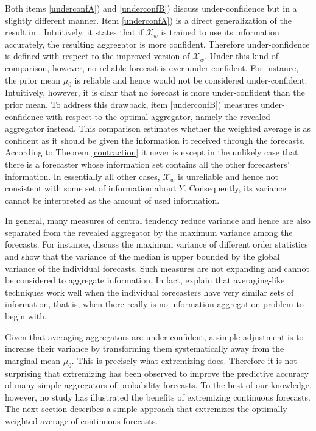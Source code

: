 \documentclass[11pt]{article}
\theoremstyle{definition}
\theoremstyle{definition}
\begin{document}
Both items \ref{underconfA}) and \ref{underconfB}) discuss under-confidence but in a slightly different manner. Item \ref{underconfA}) is a direct generalization of the result in \cite{Ranjan08}. Intuitively, it states that if $\mathcal{X}_w$ is trained to use its information accurately, the resulting aggregator is more confident. Therefore under-confidence is defined with respect to the improved version of  $\mathcal{X}_w$. Under this kind of comparison, however, no reliable forecast is ever under-confident. For instance, 
the prior mean $\mu_0$ is reliable and hence would not be considered under-confident. Intuitively, however, it is clear that no forecast is more under-confident than the prior mean. To address this drawback, item \ref{underconfB}) measures under-confidence with respect to the optimal aggregator, namely the revealed aggregator instead. This comparison estimates whether the weighted average is as confident as it should be given the information it received through the forecasts. According to Theorem \ref{contraction} it never is except in the unlikely case that there is a forecaster whose information set contains all the other forecasters' information.
 In essentially all other cases, $\mathcal{X}_w$ is unreliable 
and hence not consistent with some set of information about $Y$. Consequently, its variance cannot be interpreted as the amount of used information. 

In general, many measures of central tendency reduce variance and hence are also separated from the revealed aggregator by the maximum variance among the forecasts. For instance, \cite{papadatos1995maximum} discuss the maximum variance of different order statistics and show that the variance of the median is upper bounded by the global variance of the individual forecasts. Such measures are not expanding and cannot be considered to aggregate information. In fact, \cite{satopaamodeling} explain that averaging-like techniques work well when the individual forecasters have very similar sets of information, that is, when there really is no information aggregation problem to begin with. 

Given that averaging aggregators are under-confident, a simple adjustment is to  increase their variance by transforming them systematically away from the marginal mean $\mu_0$. This is precisely what extremizing does. Therefore it is not surprising that extremizing has been observed to improve the predictive accuracy of many simple aggregators of  probability forecasts. To the best of our knowledge, however,  no study has illustrated the benefits of extremizing continuous forecasts. The next section describes a simple approach that extremizes the optimally weighted average of continuous forecasts. 
\end{document}
